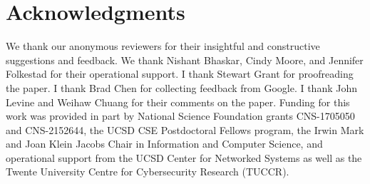 \section*{Acknowledgments}
We thank our anonymous reviewers for their insightful and constructive suggestions and feedback.
We thank Nishant Bhaskar, Cindy Moore, and Jennifer Folkestad for their operational support. I thank Stewart Grant for proofreading the paper. I thank Brad Chen for collecting feedback from Google. I thank John Levine and Weihaw Chuang for their comments on the paper.  Funding for this work was provided in part by National Science
Foundation grants CNS-1705050 and CNS-2152644, the UCSD CSE
Postdoctoral Fellows program, the Irwin Mark and Joan Klein Jacobs
Chair in Information and Computer Science, and operational support
from the UCSD Center for Networked Systems as well as the Twente University Centre for Cybersecurity Research (TUCCR).

